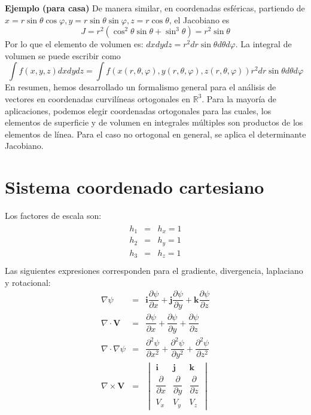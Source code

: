  \textbf{Ejemplo (para casa)} De manera similar, en coordenadas esféricas, partiendo de $x = r \sin \theta \cos \varphi, y= r \sin \theta \sin \varphi, z = r \cos \theta $, el Jacobiano es
 \[ J = r^{2} (\cos^{2} \theta \sin \theta + \sin^{3} \theta) = r^{2} \sin \theta \]
Por lo que el elemento de volumen es: $dx dy dz = r^{2} dr \sin \theta d \theta d \varphi$. La integral de volumen se puede escribir como
\[ \int f(x,y,z) dxdydz = \int f(x(r,\theta, \varphi), y(r,\theta, \varphi), z(r,\theta, \varphi)) r^{2} dr \sin \theta d \theta d \varphi  \]
En resumen, hemos desarrollado un formalismo general para el análisis de vectores en coordenadas curvilíneas ortogonales en $\mathbb{R}^{3}$. Para la mayoría de aplicaciones, podemos elegir coordenadas ortogonales para las cuales, los elementos de superficie y de volumen en integrales múltiples son productos de los elementos de línea. Para el caso no ortogonal en general, se aplica el determinante Jacobiano.
\section{Sistema coordenado cartesiano}
Los factores de escala son:
\begin{eqnarray}
\begin{aligned}
h_{1} &=& h_{x} = 1 \\
h_{2} &=& h_{y} = 1 \\
h_{3} &=& h_{z} = 1 \\
\end{aligned}
\end{eqnarray}
Las siguientes expresiones corresponden para el gradiente, divergencia, laplaciano y rotacional:
\begin{eqnarray}
\nabla \psi &=& \mathbf{i} \dfrac{\partial \psi}{\partial x} + \mathbf{j} \dfrac{\partial \psi}{\partial y} + \mathbf{k} \dfrac{\partial \psi}{\partial z} \\
\nabla \cdot \mathbf{V} &=& \dfrac{\partial \psi}{\partial x} + \dfrac{\partial \psi}{\partial y} + \dfrac{\partial \psi}{\partial z} \\
\nabla \cdot \nabla \psi &=& \dfrac{\partial^{2} \psi}{\partial x^{2}} + \dfrac{\partial^{2} \psi}{\partial y^{2}} +  \dfrac{\partial^{2} \psi}{\partial z^{2}} \\
\nabla \times \mathbf{V} &=& \begin{vmatrix}
\mathbf{i} & \mathbf{j} & \mathbf{k} \\
\dfrac{\partial}{\partial x} & \dfrac{\partial}{\partial y} & \dfrac{\partial}{\partial z} \\
V_{x} & V_{y} & V_{z}
\end{vmatrix}
\end{eqnarray}
